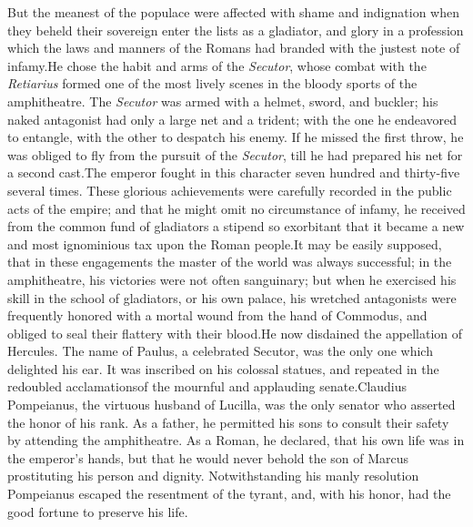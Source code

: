 
But the meanest of the populace were affected with shame and
indignation when they beheld their sovereign enter the lists as a
gladiator, and glory in a profession which the laws and manners
of the Romans had branded with the justest note of infamy.\footnotemark[36] He
chose the habit and arms of the \textit{Secutor}, whose combat with the
\textit{Retiarius} formed one of the most lively scenes in the bloody
sports of the amphitheatre. The \textit{Secutor} was armed with a
helmet, sword, and buckler; his naked antagonist had only a large
net and a trident; with the one he endeavored to entangle, with
the other to despatch his enemy. If he missed the first throw, he
was obliged to fly from the pursuit of the \textit{Secutor}, till he had
prepared his net for a second cast.\footnotemark[37] The emperor fought in this
character seven hundred and thirty-five several times. These
glorious achievements were carefully recorded in the public acts
of the empire; and that he might omit no circumstance of infamy,
he received from the common fund of gladiators a stipend so
exorbitant that it became a new and most ignominious tax upon the
Roman people.\footnotemark[38] It may be easily supposed, that in these
engagements the master of the world was always successful; in the
amphitheatre, his victories were not often sanguinary; but when
he exercised his skill in the school of gladiators, or his own
palace, his wretched antagonists were frequently honored with a
mortal wound from the hand of Commodus, and obliged to seal their
flattery with their blood.\footnotemark[39] He now disdained the appellation of
Hercules. The name of Paulus, a celebrated Secutor, was the only
one which delighted his ear. It was inscribed on his colossal
statues, and repeated in the redoubled acclamations\footnotemark[40] of the
mournful and applauding senate.\footnotemark[41] Claudius Pompeianus, the
virtuous husband of Lucilla, was the only senator who asserted
the honor of his rank. As a father, he permitted his sons to
consult their safety by attending the amphitheatre. As a Roman,
he declared, that his own life was in the emperor’s hands, but
that he would never behold the son of Marcus prostituting his
person and dignity. Notwithstanding his manly resolution
Pompeianus escaped the resentment of the tyrant, and, with his
honor, had the good fortune to preserve his life.\footnotemark[42]


